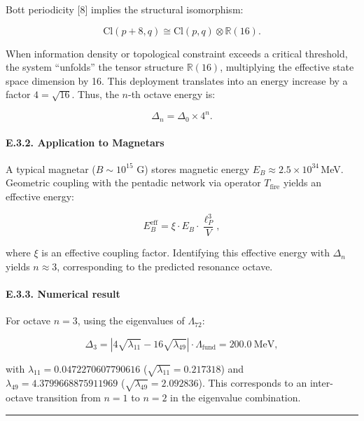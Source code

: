 \documentclass[11pt]{article}
\begin{document}
Bott periodicity {[}8{]} implies the structural isomorphism:

\[
\mathrm{Cl}(p+8, q) \cong \mathrm{Cl}(p, q) \otimes \mathbb{R}(16).
\]

When information density or topological constraint exceeds a critical
threshold, the system ``unfolds'' the tensor structure
\(\mathbb{R}(16)\), multiplying the effective state space dimension by
16. This deployment translates into an energy increase by a factor
\(4 = \sqrt{16}\). Thus, the \(n\)-th octave energy is:

\[
\Delta_n = \Delta_0 \times 4^n.
\]

\hypertarget{e.3.2.-application-to-magnetars}{%
\paragraph{E.3.2. Application to
Magnetars}\label{e.3.2.-application-to-magnetars}}

A typical magnetar (\(B \sim 10^{15}\) G) stores magnetic energy
\(E_B \approx 2.5 \times 10^{34}\)\,MeV. Geometric coupling with the
pentadic network via operator \(T_{\text{fire}}\) yields an effective
energy:

\[
E_B^{\text{eff}} = \xi \cdot E_B \cdot \frac{\ell_P^3}{V},
\]

where \(\xi\) is an effective coupling factor. Identifying this
effective energy with \(\Delta_n\) yields \(n \approx 3\), corresponding
to the predicted resonance octave.

\hypertarget{e.3.3.-numerical-result}{%
\paragraph{E.3.3. Numerical result}\label{e.3.3.-numerical-result}}

For octave \(n = 3\), using the eigenvalues of \(\Lambda_{72}\):

\[
\Delta_3 = \left| 4\sqrt{\lambda_{11}} - 16\sqrt{\lambda_{49}} \right| \cdot \Lambda_{\text{fund}} = 200.0\ \text{MeV},
\]

with \(\lambda_{11} = 0.0472270607790616\)
(\(\sqrt{\lambda_{11}} = 0.217318\)) and
\(\lambda_{49} = 4.3799668875911969\)
(\(\sqrt{\lambda_{49}} = 2.092836\)). This corresponds to an
inter-octave transition from \(n=1\) to \(n=2\) in the eigenvalue
combination.

\begin{center}\rule{0.5\linewidth}{0.5pt}\end{center}
\end{document}
